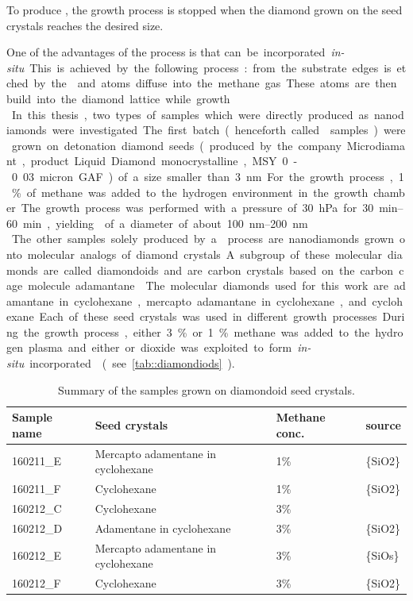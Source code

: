 	To produce \nds, the growth process is stopped when the diamond grown on the seed crystals reaches the desired size. 

	One of the advantages of the \CVD process is that \si can be incorporated \textit{in-situ}.
	This is achieved by the following process: \si from the substrate edges is etched by the  and \si atoms diffuse into the methane gas. 
	These atoms are then build into the diamond lattice while growth.
	\\
	In this thesis, two types of samples which were directly produced as nanodiamonds were investigated.
	The first batch (henceforth called \CVD samples) were grown on detonation diamond seeds (produced by the company Microdiamant, product Liquid Diamond monocrystalline, MSY 0-0.03 micron GAF) of a size smaller than \SI{3}{nm}.
	For the growth process, 1\% of methane was added to the hydrogen environment in the growth chamber.
	The growth process was performed with a pressure of \SI{30}{hPa} for \SIrange{30}{60}{min}, yielding \nds of a diameter of about \SIrange{100}{200}{nm}.
	\\
	The other samples solely produced by a \CVD process are nanodiamonds grown onto molecular analogs of diamond crystals.
	A subgroup of these molecular diamonds are called diamondoids and are carbon crystals based on the carbon cage molecule adamantane .
	The molecular diamonds used for this work are adamantane in cyclohexane, mercapto adamantane in cyclohexane, and cyclohexane.
	Each of these seed crystals was used in different growth processes.
	During the growth process, either 3\% or 1\% methane was added to the hydrogen plasma and either \si or \si dioxide was exploited to form \textit{in-situ} incorporated \sivs (see \autoref{tab::diamondiods}).


	\begin{table}[tp] 
		\centering 
		\caption{Summary of the samples grown on diamondoid seed crystals.} \label{tab::diamondiods} 
			\begin{tabular}{llll} 
			\toprule
			Sample name & Seed crystals & Methane conc. & \Si source \\ 
			\midrule
			160211\_E & Mercapto adamentane in cyclohexane & 1\% & \ch\{SiO2\} \\
			160211\_F & Cyclohexane                        & 1\% & \ch\{SiO2\} \\
			160212\_C & Cyclohexane                        & 3\% & \si         \\
			160212\_D & Adamentane in cyclohexane          & 3\% & \ch\{SiO2\} \\
			160212\_E & Mercapto adamentane in cyclohexane & 3\% & \ch\{SiOs\} \\
			160212\_F & Cyclohexane                        & 3\% & \ch\{SiO2\}\\
			\bottomrule
			\end{tabular} 
	\end{table}







